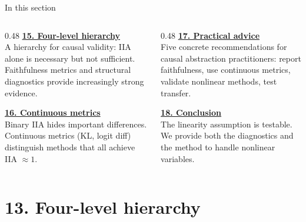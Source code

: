 \documentclass[aspectratio=169,11pt]{beamer}
\begin{document}

\begin{frame}[plain]
\vfill
\begin{center}
  \setlength{\fboxrule}{2.5pt}%
\end{center}
\vfill
\end{frame}

\begin{frame}{In this section}
\begin{columns}[T]
\begin{column}{0.48\textwidth}
\textbf{\hyperlink{sec13}{15. Four-level hierarchy}}\\[0.2em]
{\small A hierarchy for causal validity: IIA alone is necessary but not sufficient. Faithfulness metrics and structural diagnostics provide increasingly strong evidence.}

\vspace{0.6em}
\textbf{\hyperlink{sec14}{16. Continuous metrics}}\\[0.2em]
{\small Binary IIA hides important differences. Continuous metrics (KL, logit diff) distinguish methods that all achieve IIA $\approx 1$.}
\end{column}
\begin{column}{0.48\textwidth}
\textbf{\hyperlink{sec15}{17. Practical advice}}\\[0.2em]
{\small Five concrete recommendations for causal abstraction practitioners: report faithfulness, use continuous metrics, validate nonlinear methods, test transfer.}

\vspace{0.6em}
\textbf{\hyperlink{sec16}{18. Conclusion}}\\[0.2em]
{\small The linearity assumption is testable. We provide both the diagnostics and the method to handle nonlinear variables.}
\end{column}
\end{columns}
\end{frame}

\hypertarget{sec13}{}
\section{13. Four-level hierarchy}
\end{document}
